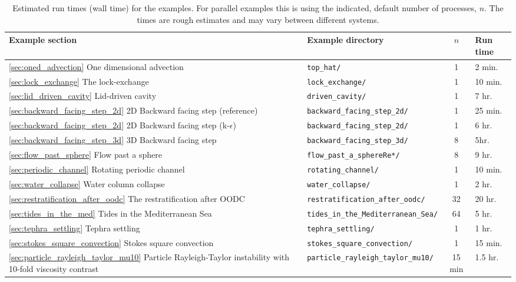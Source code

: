 \begin{table}
\centering
\begin{tabular}{|l|l|c|l|}
  \hline
  Example section & Example directory & $n$ & Run time \\
  \hline
  \ref{sec:oned_advection} One dimensional advection & \texttt{top\_hat/} & 1 & 2 min. \\
  \ref{sec:lock_exchange} The lock-exchange & \texttt{lock\_exchange/} & 1 & 10 min. \\
  \ref{sec:lid_driven_cavity} Lid-driven cavity & \texttt{driven\_cavity/} & 1 & 7 hr. \\
  \ref{sec:backward_facing_step_2d} 2D Backward facing step (reference) & \texttt{backward\_facing\_step\_2d/} & 1 & 25 min. \\
  \ref{sec:backward_facing_step_2d} 2D Backward facing step (k-$\epsilon$) & \texttt{backward\_facing\_step\_2d/} & 1 & 6 hr. \\
  \ref{sec:backward_facing_step_3d} 3D Backward facing step & \texttt{backward\_facing\_step\_3d/} & 8 & 5hr. \\
  \ref{sec:flow_past_sphere} Flow past a sphere & \texttt{flow\_past\_a\_sphereRe*/} & 8 & 9 hr. \\
  \ref{sec:periodic_channel} Rotating periodic channel & \texttt{rotating\_channel/} & 1 & 10 min. \\
  \ref{sec:water_collapse} Water column collapse & \texttt{water\_collapse/} & 1 & 2 hr. \\
  \ref{sec:restratification_after_oodc} The restratification after OODC & \texttt{restratification\_after\_oodc/} & 32 & 20 hr. \\
  \ref{sec:tides_in_the_med} Tides in the Mediterranean Sea  & \texttt{tides\_in\_the\_Mediterranean\_Sea/} & 64 & 5 hr. \\
  \ref{sec:tephra_settling} Tephra settling & \texttt{tephra\_settling/} & 1 & 1 hr. \\
  \ref{sec:stokes_square_convection} Stokes square convection & \texttt{stokes\_square\_convection/} & 1 & 15 min. \\
  \ref{sec:particle_rayleigh_taylor_mu10} Particle Rayleigh-Taylor instability with 10-fold viscosity contrast & \texttt{particle\_rayleigh\_taylor\_mu10/} & 15 min & 1.5 hr. \\
  \hline
\end{tabular}
\caption{Estimated run times (wall time) for the examples. For parallel examples this is using
the indicated, default number of processes, $n$. The times are rough estimates and may vary between
different systems.} \label{tab:example_runtimes}
\end{table}


